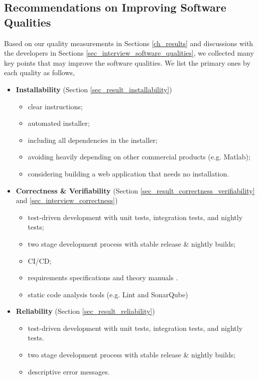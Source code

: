 \documentclass[final, 3p, times, authoryear]{elsarticle}
\begin{document}
\subsection{Recommendations on Improving Software Qualities} \label{sec_recommendations_qualities}

Based on our quality measurements in Sections \ref{ch_results} and discussions
with the developers in Sections \ref{sec_interview_software_qualities}, we
collected many key points that may improve the software qualities. We list the
primary ones by each quality as follows,
\begin{itemize}
\item \textbf{Installability} (Section \ref{sec_result_installability})
\begin{itemize}
    \item clear instructions;
    \item automated installer;
    \item including all dependencies in the installer;
    \item avoiding heavily depending on other commercial products (e.g. Matlab);
    \item considering building a web application that needs no installation.
\end{itemize}
\item \textbf{Correctness \& Verifiability} (Section \ref{sec_result_correctness_verifiability} and \ref{sec_interview_correctness})
\begin{itemize}
    \item test-driven development with unit tests, integration tests, and nightly tests;
    \item two stage development process with stable release \& nightly builds;
    \item CI/CD;
    \item requirements specifications and theory manuals \citep{Smith2016} \citep{SmithAndLai2005}.
    \item static code analysis tools (e.g. Lint and SonarQube)
\end{itemize}
\item \textbf{Reliability} (Section \ref{sec_result_reliability})
\begin{itemize}
    \item test-driven development with unit tests, integration tests, and nightly tests.
    \item two stage development process with stable release \& nightly builds;
    \item descriptive error messages.

\end{itemize}
\end{itemize}
\end{document}
